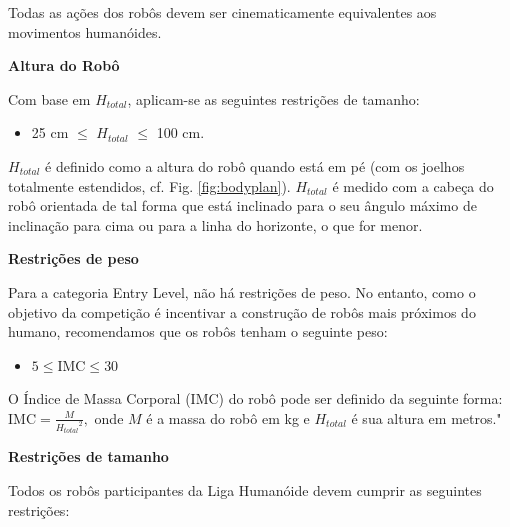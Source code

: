 \bigskip

Todas as ações dos robôs devem ser cinematicamente equivalentes aos movimentos humanóides.

\bigskip

{\bfseries Altura do Robô}

\headlinebox

Com base em $H_{total}$, aplicam-se as seguintes restrições de tamanho:
\begin{itemize}
\item 25 cm ${\leq}$ $H_{total}$ ${\leq}$ 100 cm.
\end{itemize}

$H_{total}$ é definido como a altura do robô quando está em pé
(com os joelhos totalmente estendidos, cf. Fig. \ref{fig:bodyplan}).
$H_{total}$ é medido com a cabeça do robô orientada de tal forma que
está inclinado para o seu ângulo máximo de inclinação para cima ou para a linha do horizonte, o que for menor.

\newpage

{\bfseries Restrições de peso}

\headlinebox

Para a categoria Entry Level, não há restrições de peso. No entanto, como o objetivo da competição é incentivar a construção de robôs mais próximos do humano, recomendamos que os robôs tenham o seguinte peso:

\begin{itemize}
  \item $5 \leq \mathrm{IMC} \leq 30$
\end{itemize}

O Índice de Massa Corporal (IMC) do robô pode ser definido da seguinte forma:
$\mathrm{IMC} = \frac{M}{{H_{total}}^2},$
onde $M$ é a massa do robô em kg e $H_{total}$ é sua altura em metros."

\bigskip

{\bfseries Restrições de tamanho}

\headlinebox

Todos os robôs participantes da Liga Humanóide devem cumprir as seguintes restrições:


